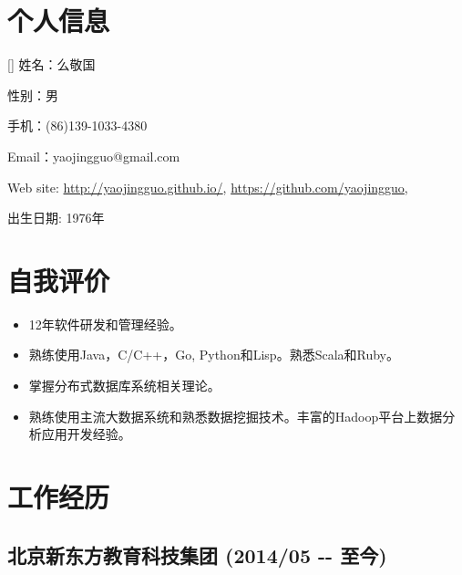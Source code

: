 \documentclass[a4paper]{article}
\newenvironment{DUlineblock}[1]{%
    \list{}{\setlength{\partopsep}{\parskip}
            \addtolength{\partopsep}{\baselineskip}
            \setlength{\topsep}{0pt}
            \setlength{\itemsep}{0.15\baselineskip}
            \setlength{\parsep}{0pt}
            \setlength{\leftmargin}{#1}}
    \raggedright
  }
  {\endlist}
\begin{document}
\begin{CJK}{UTF8}{gkai}

\section*{个人信息}

\begin{DUlineblock}{0em}
\item[] 姓名：么敬国
\item[] 性别：男
\item[] 手机：(86)139-1033-4380
\item[] Email：yaojingguo@gmail.com
\item[] Web site: \url{http://yaojingguo.github.io/},
\url{https://github.com/yaojingguo},
\item[] 出生日期: 1976年
\end{DUlineblock}

\section*{自我评价}
\begin{itemize}
\item 12年软件研发和管理经验。
\item 熟练使用Java，C/C++，Go, Python和Lisp。熟悉Scala和Ruby。
\item 掌握分布式数据库系统相关理论。
\item 熟练使用主流大数据系统和熟悉数据挖掘技术。丰富的Hadoop平台上数据分析应用开发经验。
\end{itemize}

\section*{工作经历}
\subsection*{北京新东方教育科技集团 (2014/05 -{}- 至今)}

\end{CJK}
\end{document}
